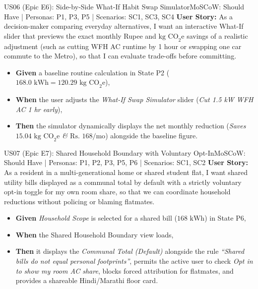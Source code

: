 \documentclass[12pt, a4paper]{article}
\begin{document}
\begin{storybox}{US06 (Epic E6): Side-by-Side What-If Habit Swap Simulator}{MoSCoW: Should Have | Personas: P1, P3, P5 | Scenarios: SC1, SC3, SC4}
\textbf{User Story:} As a decision-maker comparing everyday alternatives, I want an interactive What-If slider that previews the exact monthly Rupee and $\text{kg CO}_2\text{e}$ savings of a realistic adjustment (such as cutting WFH AC runtime by 1 hour or swapping one car commute to the Metro), so that I can evaluate trade-offs before committing.
\begin{itemize}
    \item \textbf{Given} a baseline routine calculation in State P2 ($168.0\text{ kWh} = 120.29\text{ kg CO}_2\text{e}$),
    \item \textbf{When} the user adjusts the \textit{What-If Swap Simulator} slider (\textit{Cut 1.5 kW WFH AC 1 hr early}),
    \item \textbf{Then} the simulator dynamically displays the net monthly reduction (\textit{Saves $15.04\text{ kg CO}_2\text{e}$ \& $\text{Rs. }168\text{/mo}$}) alongside the baseline figure.
\end{itemize}
\end{storybox}

\begin{storybox}{US07 (Epic E7): Shared Household Boundary with Voluntary Opt-In}{MoSCoW: Should Have | Personas: P1, P2, P3, P5, P6 | Scenarios: SC1, SC2}
\textbf{User Story:} As a resident in a multi-generational home or shared student flat, I want shared utility bills displayed as a communal total by default with a strictly voluntary opt-in toggle for my own room share, so that we can coordinate household reductions without policing or blaming flatmates.
\begin{itemize}
    \item \textbf{Given} \textit{Household Scope} is selected for a shared bill ($168\text{ kWh}$) in State P6,
    \item \textbf{When} the Shared Household Boundary view loads,
    \item \textbf{Then} it displays the \textit{Communal Total (Default)} alongside the rule \textit{``Shared bills do not equal personal footprints''}, permits the active user to check \textit{Opt in to show my room AC share}, blocks forced attribution for flatmates, and provides a shareable Hindi/Marathi floor card.
\end{itemize}
\end{storybox}
\end{document}
